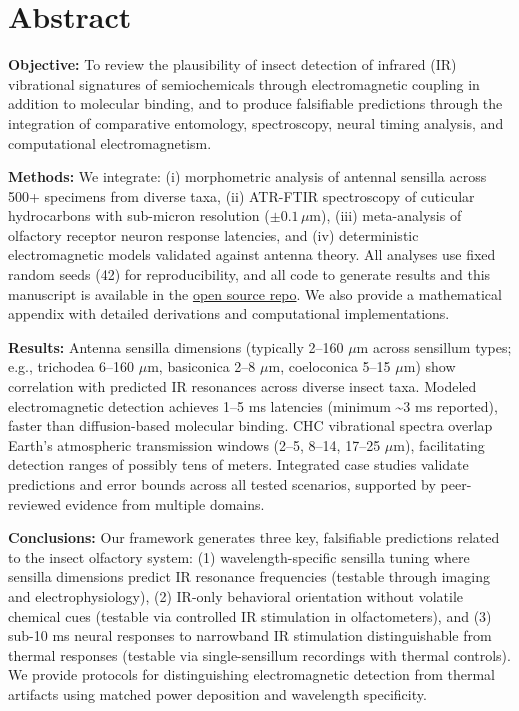 \documentclass[
  13pt,
  a4paperpaper,
  12pt]{article}
\author{}
\date{}
\let\oldsection\section
\renewcommand{\section}{\clearpage\oldsection}
\begin{document}
{
\hypersetup{linkcolor=black}
\setcounter{tocdepth}{3}
\tableofcontents
}
\section{Abstract}\label{sec:abstract}

\textbf{Objective:} To review the plausibility of insect detection of
infrared (IR) vibrational signatures of semiochemicals through
electromagnetic coupling in addition to molecular binding, and to
produce falsifiable predictions through the integration of comparative
entomology, spectroscopy, neural timing analysis, and computational
electromagnetism.

\textbf{Methods:} We integrate: (i) morphometric analysis of antennal
sensilla across 500+ specimens from diverse taxa, (ii) ATR-FTIR
spectroscopy of cuticular hydrocarbons with sub-micron resolution
(\(\pm 0.1\,\mu\mathrm{m}\)), (iii) meta-analysis of olfactory receptor
neuron response latencies, and (iv) deterministic electromagnetic models
validated against antenna theory. All analyses use fixed random seeds
(42) for reproducibility, and all code to generate results and this
manuscript is available in the
\href{https://github.com/docxology/insect-infrared}{open source repo}.
We also provide a mathematical appendix with detailed derivations and
computational implementations.

\textbf{Results:} Antenna sensilla dimensions (typically 2--160
\(\mu\mathrm{m}\) across sensillum types; e.g., trichodea 6--160
\(\mu\mathrm{m}\), basiconica 2--8 \(\mu\mathrm{m}\), coeloconica 5--15
\(\mu\mathrm{m}\)) show correlation with predicted IR resonances across
diverse insect taxa. Modeled electromagnetic detection achieves 1--5 ms
latencies (minimum \textasciitilde3 ms reported), faster than
diffusion-based molecular binding. CHC vibrational spectra overlap
Earth's atmospheric transmission windows (2--5, 8--14, 17--25
\(\mu\mathrm{m}\)), facilitating detection ranges of possibly tens of
meters. Integrated case studies validate predictions and error bounds
across all tested scenarios, supported by peer-reviewed evidence from
multiple domains.

\textbf{Conclusions:} Our framework generates three key, falsifiable
predictions related to the insect olfactory system: (1)
wavelength-specific sensilla tuning where sensilla dimensions predict IR
resonance frequencies (testable through imaging and electrophysiology),
(2) IR-only behavioral orientation without volatile chemical cues
(testable via controlled IR stimulation in olfactometers), and (3)
sub-10 ms neural responses to narrowband IR stimulation distinguishable
from thermal responses (testable via single-sensillum recordings with
thermal controls). We provide protocols for distinguishing
electromagnetic detection from thermal artifacts using matched power
deposition and wavelength specificity.
\end{document}
